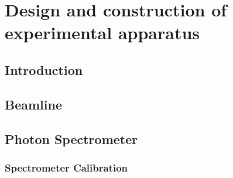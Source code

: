 \chapter{Design and construction of experimental apparatus}
\label{beamline}

\section{Introduction}
\label{intro_beamline}


\section{Beamline}
\label{sec:full_beamline}
\section{Photon Spectrometer}
\label{sec:photon_spec}
\subsection{Spectrometer Calibration}
\label{subsec:spec_calibration}